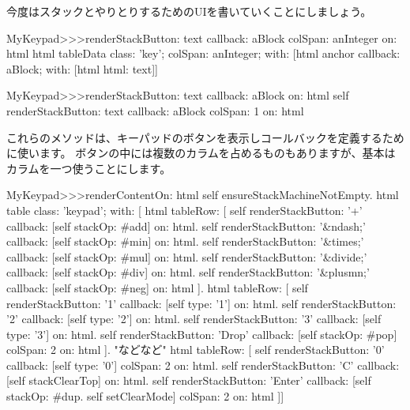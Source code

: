 \documentclass[a4paper,10pt,twoside]{book}
\begin{document}
今度はスタックとやりとりするためのUIを書いていくことにしましょう。


\begin{code}{}
MyKeypad>>>renderStackButton: text callback: aBlock colSpan: anInteger on: html 
	html tableData
		class: 'key';
		colSpan: anInteger;
		with: 
				[html anchor
					callback: aBlock;
					with: [html html: text]]
\end{code}


\begin{code}{}
MyKeypad>>>renderStackButton: text callback: aBlock on: html 
	self 
		renderStackButton: text
		callback: aBlock
		colSpan: 1
		on: html
\end{code}

これらのメソッドは、キーパッドのボタンを表示しコールバックを定義するために使います。
ボタンの中には複数のカラムを占めるものもありますが、基本はカラムを一つ使うことにします。


\begin{code}{}
MyKeypad>>>renderContentOn: html 
  self ensureStackMachineNotEmpty.
  html table
    class: 'keypad';
    with: [
      html tableRow: [
          self renderStackButton: '+' callback: [self stackOp: #add] on: html.
          self renderStackButton: '&ndash;' callback: [self stackOp: #min] on: html.
          self renderStackButton: '&times;' callback: [self stackOp: #mul] on: html.
          self renderStackButton: '&divide;' callback: [self stackOp: #div] on: html.
          self renderStackButton: '&plusmn;' callback: [self stackOp: #neg] on: html ].
        html tableRow: [
          self renderStackButton: '1' callback: [self type: '1'] on: html.
          self renderStackButton: '2' callback: [self type: '2'] on: html.
          self renderStackButton: '3' callback: [self type: '3'] on: html.
          self renderStackButton: 'Drop' callback: [self stackOp: #pop]
          	colSpan: 2 on: html ].
"などなど"
        html tableRow: [
          self renderStackButton: '0' callback: [self type: '0'] colSpan: 2 on: html.
          self renderStackButton: 'C' callback: [self stackClearTop] on: html.
          self renderStackButton: 'Enter'
          	callback: [self stackOp: #dup. self setClearMode]
			colSpan: 2 on: html ]]
\end{code}
\end{document}
